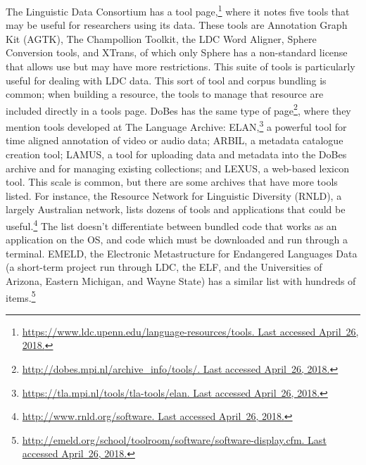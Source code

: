 The Linguistic Data Consortium has a tool page,\footnote{\href{https://www.ldc.upenn.edu/language-resources/tools}{https://www.ldc.upenn.edu/language-resources/tools. Last accessed April~26, 2018.}} where it notes five tools that may be useful for researchers using its data. These tools are Annotation Graph Kit (AGTK), The Champollion Toolkit, the LDC Word Aligner, Sphere Conversion tools, and XTrans, of which only Sphere has a non-standard license that allows use but may have more restrictions. This suite of tools is particularly useful for dealing with LDC data. This sort of tool and corpus bundling is common; when building a resource, the tools to manage that resource are included directly in a tools page. DoBes has the same type of page\footnote{\href{http://dobes.mpi.nl/archive\_info/tools/}{http://dobes.mpi.nl/archive\_info/tools/. Last accessed April~26, 2018.}}, where they mention tools developed at The Language Archive: ELAN,\footnote{\href{https://tla.mpi.nl/tools/tla-tools/elan/}{https://tla.mpi.nl/tools/tla-tools/elan. Last accessed April~26, 2018.}} a powerful tool for time aligned annotation of video or audio data; ARBIL, a metadata catalogue creation tool; LAMUS, a tool for uploading data and metadata into the DoBes archive and for managing existing collections; and LEXUS, a web-based lexicon tool. This scale is common, but there are some archives that have more tools listed. For instance, the Resource Network for Linguistic Diversity (RNLD), a largely Australian network, lists dozens of tools and applications that could be useful.\footnote{\href{http://www.rnld.org/software}{http://www.rnld.org/software. Last accessed April~26, 2018.}} The list doesn't differentiate between bundled code that works as an application on the OS, and code which must be downloaded and run through a terminal. EMELD, the Electronic Metastructure for Endangered Languages Data (a short-term project run through LDC, the ELF, and the Universities of Arizona, Eastern Michigan, and Wayne State) has a similar list with hundreds of items.\footnote{\href{http://emeld.org/school/toolroom/software/software-display.cfm}{http://emeld.org/school/toolroom/software/software-display.cfm. Last accessed April~26, 2018.}}

